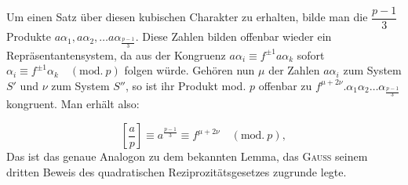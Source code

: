 Um einen Satz über diesen kubischen Charakter zu erhalten, bilde man die
$\dfrac{p-1}{3}$ Produkte $a\alpha_1, a\alpha_2, \ldots
a\alpha_{\frac{p-1}{3}}$. Diese Zahlen bilden offenbar wieder ein
Repräsentantensystem, da aus der Kongruenz $a\alpha_i \equiv
f^{\pm1}a\alpha_k$ sofort $\alpha_i \equiv f^{\pm1}\alpha_k \quad(\mathrm{mod.}\ p)$ folgen würde.
Gehören nun $\mu$ der Zahlen $a\alpha_i$ zum System $S'$ und $\nu$
zum System $S''$, so ist ihr Produkt mod. $p$ offenbar zu
$f^{\mu+2\nu}. \alpha_1\alpha_2\ldots\alpha_{\frac{p-1}{3}}$ kongruent. Man erhält also:

\[
\left[\frac{a}{p}\right] \equiv a^{\frac{p-1}{3}} \equiv f^{\mu+2\nu} \quad(\mathrm{mod.}\ p),
\]
\noindent Das ist das genaue Analogon zu dem bekannten Lemma, das \textsc{Gauss}
seinem dritten Beweis des quadratischen Reziprozitätsgesetzes zugrunde legte.

